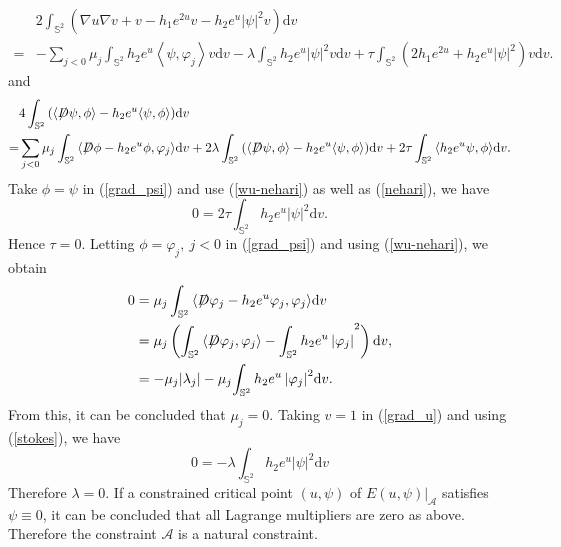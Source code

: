 \documentclass[a4paper, 12pt]{article}
\def\slashiii#1{\setbox0=\hbox{$#1$}#1\hskip-\wd0\hbox to\wd0{\hss\sl/\/\hss}}
\begin{document}
\begin{equation}\label{grad_u}
	\begin{aligned}
		&2\int_{{\mathbb{S}^2}} {\left( {\nabla u\nabla v + v - h_1{e^{2u}}v - {h_2}{e^{u}}|\psi {|^2}v} \right)}{\text{d}{v}}   \\
		=  &- \sum_{j<0}{\mu _j}\int_{{\mathbb{S}^2}} {h_2}{{e^{u}}\left\langle {\psi ,{\varphi _j}} \right\rangle v}{\text{d}{v}}  - \lambda \int_{{\mathbb{S}^2}} {h_2}{{e^{u}}} |\psi {|^2}v{\text{d}{v}} + \tau \int_{{\mathbb{S}^2}} {\left( {2h_1{e^{2u}} + {h_2}{ e^{u}}|\psi {|^2}} \right)} v {\text{d}{v}}.
	\end{aligned}
\end{equation}
and
\begin{equation}\label{grad_psi}
	\begin{aligned}
		&4\int_{{\mathbb{S}^2}} {\left( {\langle \slashiii{D}\psi ,\phi \rangle  - {h_2}{ e^{u}}\langle \psi ,\phi \rangle } \right)}{\text{d}{v}}  \\
		=	& \sum_{j<0}{\mu _j}\int_{{\mathbb{S}^2}} {\left\langle {\slashiii{D}\phi  - {h_2}{ e^{u}}\phi ,{\varphi _j}} \right\rangle }{\text{d}{v}}  + 2\lambda \int_{{\mathbb{S}^2}} {\left( {\langle \slashiii{D}\psi ,\phi \rangle  - {h_2}{ e^{u}}\langle \psi ,\phi \rangle } \right)}{\text{d}{v}}  + 2\tau \int_{{\mathbb{S}^2}} {\left\langle {{ {h_2}e^{u}}\psi ,\phi } \right\rangle }{\text{d}{v}} .
	\end{aligned}
\end{equation}
Take $\phi=\psi$ in (\ref{grad_psi}) and use (\ref{wu-nehari}) as well as (\ref{nehari}), we have
\begin{equation*}
	0 = 2\tau \int_{{\mathbb{S}^2}} {h_2}{{ e^{u}}{{\left| \psi  \right|}^2}}{\text{d}{v}}. \end{equation*}
Hence $\tau  = 0$. Letting $\phi=\varphi_j ,\ j<0$ in (\ref{grad_psi}) and using (\ref{wu-nehari}), we obtain \begin{equation*}
	\begin{aligned}
		0& = {\mu _j}\int_{{\mathbb{S}^2}} {\left\langle {\slashiii{D}{\varphi _j} - {h_2}{ e^{u}}{\varphi _j},{\varphi _j}} \right\rangle }{\text{d}{v}}   \\
		&= {\mu _j}\left( {\int_{{\mathbb{S}^2}} {\left\langle {\slashiii{D}{\varphi _j},{\varphi _j}} \right\rangle }  - {{\int_{{\mathbb{S}^2}} {h_2}{{ e^{u}}\left| {{\varphi _j}} \right|} }^2}} \right){\text{d}{v}},  \\
		&=  - {\mu _j}|\lambda_j| - {\mu _j}{\int_{{\mathbb{S}^2}} {h_2}{{ e^{u}}\left| {{\varphi _j}} \right|} ^2}{\text{d}{v}}.
	\end{aligned}
\end{equation*}
From this, it can be concluded that $\mu_j=0$. Taking $v=1$ in (\ref{grad_u}) and using (\ref{stokes}), we have
\begin{equation*}
	0 =  - \lambda \int_{{\mathbb{S}^2}} {h_2}{{ e^{u}}} |\psi {|^2}{\text{d}{v}}
\end{equation*}
Therefore $\lambda=0$.	If a constrained critical point $(u,\psi)$ of ${\left. {E(u,\psi )} \right|_\mathcal{A}}$ satisfies $\psi\equiv 0$, it can be concluded that all Lagrange multipliers are zero as above. Therefore the constraint $\mathcal{A} $ is a natural constraint.
\end{document}

